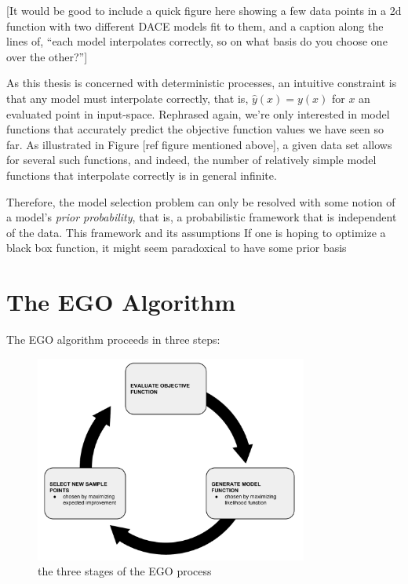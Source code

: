 \documentclass[letterpaper]{article}
\begin{document}
[It would be good to include a quick figure here showing a few data points in a 2d function with two different DACE models fit to them, and a caption along the lines of, ``each model interpolates correctly, so on what basis do you choose one over the other?'']

As this thesis is concerned with deterministic processes, an intuitive constraint is that any model must interpolate correctly, that is, $\hat{y}(x) = y(x)$ for $x$ an evaluated point in input-space. Rephrased again, we're only interested in model functions that accurately predict the objective function values we have seen so far. As illustrated in Figure [ref figure mentioned above], a given data set allows for several such functions, and indeed, the number of relatively simple model functions that interpolate correctly is in general infinite.

Therefore, the model selection problem can only be resolved with some notion of a model's \emph{prior probability}, that is, a probabilistic framework that is independent of the data. This framework and its assumptions
If one is hoping to optimize a black box function, it might seem paradoxical to have some prior basis



\section{The EGO Algorithm}
The EGO algorithm \cite{jones_efficient_1998} proceeds in three steps:



\begin{figure}
	\centering
	\includegraphics[width=0.8\textwidth]{EGO_cycle_v1}
	\caption{the three stages of the EGO process}
	\label{fig:ego_cycle}

\end{figure}
\end{document}
